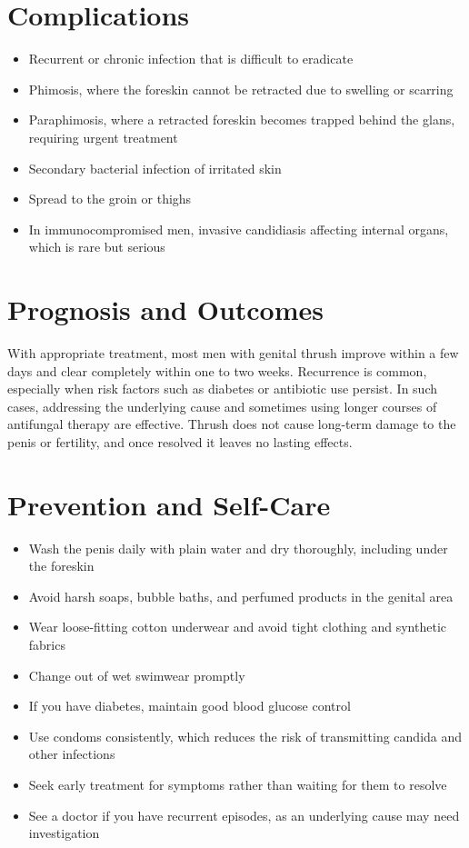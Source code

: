 \section*{Complications}
\begin{itemize}
    \item Recurrent or chronic infection that is difficult to eradicate
    \item Phimosis, where the foreskin cannot be retracted due to swelling or scarring
    \item Paraphimosis, where a retracted foreskin becomes trapped behind the glans, requiring urgent treatment
    \item Secondary bacterial infection of irritated skin
    \item Spread to the groin or thighs
    \item In immunocompromised men, invasive candidiasis affecting internal organs, which is rare but serious
\end{itemize}

\section*{Prognosis and Outcomes}
With appropriate treatment, most men with genital thrush improve within a few days and clear completely within one to two weeks. Recurrence is common, especially when risk factors such as diabetes or antibiotic use persist. In such cases, addressing the underlying cause and sometimes using longer courses of antifungal therapy are effective. Thrush does not cause long-term damage to the penis or fertility, and once resolved it leaves no lasting effects.

\section*{Prevention and Self-Care}
\begin{itemize}
    \item Wash the penis daily with plain water and dry thoroughly, including under the foreskin
    \item Avoid harsh soaps, bubble baths, and perfumed products in the genital area
    \item Wear loose-fitting cotton underwear and avoid tight clothing and synthetic fabrics
    \item Change out of wet swimwear promptly
    \item If you have diabetes, maintain good blood glucose control
    \item Use condoms consistently, which reduces the risk of transmitting candida and other infections
    \item Seek early treatment for symptoms rather than waiting for them to resolve
    \item See a doctor if you have recurrent episodes, as an underlying cause may need investigation
\end{itemize}

